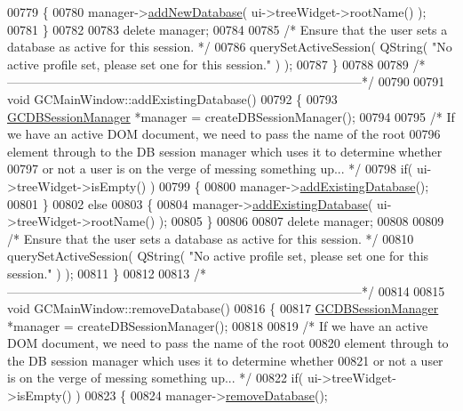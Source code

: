 \begin{DoxyCode}
{{{{00779   \{
00780     manager->\hyperlink{class_g_c_d_b_session_manager_ad029ca4ec8ffff788a281f1b3f3eee71}{addNewDatabase}( ui->treeWidget->rootName() );
00781   \}
00782 
00783   \textcolor{keyword}{delete} manager;
00784 
00785   \textcolor{comment}{/* Ensure that the user sets a database as active for this session. */}
00786   querySetActiveSession( QString( \textcolor{stringliteral}{"No active profile set, please set one for
       this session."} ) );
00787 \}
00788 
00789 \textcolor{comment}{/*
      --------------------------------------------------------------------------------------*/}
00790 
00791 \textcolor{keywordtype}{void} GCMainWindow::addExistingDatabase()
00792 \{
00793   \hyperlink{class_g_c_d_b_session_manager}{GCDBSessionManager} *manager = createDBSessionManager();
00794 
00795   \textcolor{comment}{/* If we have an active DOM document, we need to pass the name of the root}
00796 \textcolor{comment}{    element through to the DB session manager which uses it to determine
       whether}
00797 \textcolor{comment}{    or not a user is on the verge of messing something up... */}
00798   \textcolor{keywordflow}{if}( ui->treeWidget->isEmpty() )
00799   \{
00800     manager->\hyperlink{class_g_c_d_b_session_manager_a52f3407b7ad5cac7c8c422d2528b28fc}{addExistingDatabase}();
00801   \}
00802   \textcolor{keywordflow}{else}
00803   \{
00804     manager->\hyperlink{class_g_c_d_b_session_manager_a52f3407b7ad5cac7c8c422d2528b28fc}{addExistingDatabase}( ui->treeWidget->rootName() );
00805   \}
00806 
00807   \textcolor{keyword}{delete} manager;
00808 
00809   \textcolor{comment}{/* Ensure that the user sets a database as active for this session. */}
00810   querySetActiveSession( QString( \textcolor{stringliteral}{"No active profile set, please set one for
       this session."} ) );
00811 \}
00812 
00813 \textcolor{comment}{/*
      --------------------------------------------------------------------------------------*/}
00814 
00815 \textcolor{keywordtype}{void} GCMainWindow::removeDatabase()
00816 \{
00817   \hyperlink{class_g_c_d_b_session_manager}{GCDBSessionManager} *manager = createDBSessionManager();
00818 
00819   \textcolor{comment}{/* If we have an active DOM document, we need to pass the name of the root}
00820 \textcolor{comment}{    element through to the DB session manager which uses it to determine
       whether}
00821 \textcolor{comment}{    or not a user is on the verge of messing something up... */}
00822   \textcolor{keywordflow}{if}( ui->treeWidget->isEmpty() )
00823   \{
00824     manager->\hyperlink{class_g_c_d_b_session_manager_a0fc44e9d2efb407cc0964295920b2432}{removeDatabase}();
}}}}
\end{DoxyCode}
